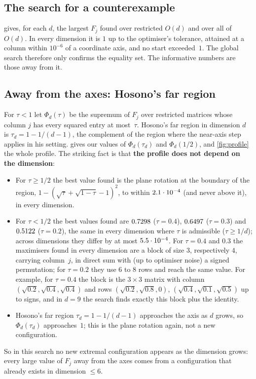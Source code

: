 \documentclass[11pt,a4paper]{article}
\begin{document}
\subsection{The search for a counterexample}
 gives, for each $d$, the largest $F_j$ found over restricted $O(d)$ and over all of $O(d)$. In every dimension it is $1$ up to the optimiser's tolerance, attained at a column within $10^{-6}$ of a coordinate axis, and no start exceeded~$1$. The global search therefore only confirms the equality set. The informative numbers are those away from it.

\begin{table}[t]
\centering\small

\caption{Largest $F_j$ found, restricted (rows $\le2$) and unrestricted, with the number of optimised starts. The column of the maximiser is within $10^{-6}$ of an axis in every case. No start gave $F_j>1$.}
\label{tab:global}
\end{table}

\subsection{Away from the axes: Hosono's far region}\label{sec:far}
For $\tau<1$ let $\Phi_d(\tau)$ be the supremum of $F_j$ over restricted matrices whose column $j$ has every squared entry at most~$\tau$. Hosono's far region in dimension $d$ is $\tau_d=1-1/(d-1)$, the complement of the region where the near-axis step applies in his setting.  gives our values of $\Phi_d(\tau_d)$ and $\Phi_d(1/2)$, and \cref{fig:profile} the whole profile. The striking fact is that \textbf{the profile does not depend on the dimension}:
\begin{itemize}
\item For $\tau\ge1/2$ the best value found is the plane rotation at the boundary of the region, $1-(\sqrt\tau+\sqrt{1-\tau}-1)^2$, to within $2.1\cdot10^{-4}$ (and never above it), in every dimension.
\item For $\tau<1/2$ the best values found are $0.7298$ ($\tau=0.4$), $0.6497$ ($\tau=0.3$) and $0.5122$ ($\tau=0.2$), the same in every dimension where $\tau$ is admissible ($\tau\ge1/d$); across dimensions they differ by at most $5.5\cdot10^{-4}$. For $\tau=0.4$ and $0.3$ the maximisers found in every dimension are a block of size $3$, respectively $4$, carrying column~$j$, in direct sum with (up to optimiser noise) a signed permutation; for $\tau=0.2$ they use $6$ to $8$ rows and reach the same value. For example, for $\tau=0.4$ the block is the $3\times3$ matrix with column $(\sqrt{0.2},\sqrt{0.4},\sqrt{0.4})$ and rows $(\sqrt{0.2},\sqrt{0.8},0)$, $(\sqrt{0.4},\sqrt{0.1},\sqrt{0.5})$ up to signs, and in $d=9$ the search finds exactly this block plus the identity.
\item Hosono's far region $\tau_d=1-1/(d-1)$ approaches the axis as $d$ grows, so $\Phi_d(\tau_d)$ approaches~$1$; this is the plane rotation again, not a new configuration.
\end{itemize}
So in this search no new extremal configuration appears as the dimension grows: every large value of $F_j$ away from the axes comes from a configuration that already exists in dimension $\le6$.
\end{document}
